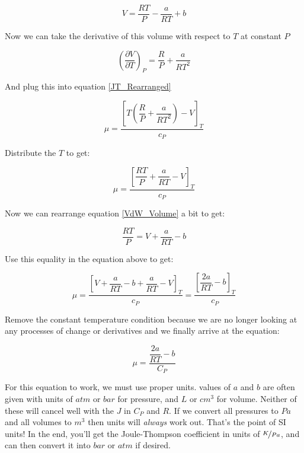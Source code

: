 \documentclass[12pt,letterpaper]{article}
\begin{document}
	\begin{equation}\label{VdW_Volume}
		V = \dfrac{RT}{P} - \dfrac{a}{RT} + b
	\end{equation}
	
	Now we can take the derivative of this volume with respect to $T$ at constant $P$
	
	\begin{equation}
		\left(\frac{\partial V}{\partial T}\right)_P = \dfrac{R}{P} + \dfrac{a}{RT^2}
	\end{equation}
	
	And plug this into equation \ref{JT_Rearranged}
	
	\begin{equation}\label{JT_Rearranged}
		\mu = \dfrac{\left[T \left(\dfrac{R}{P} + \dfrac{a}{RT^2}\right)-V\right]_T}{c_P}
	\end{equation}

	Distribute the $T$ to get:
	
	\begin{equation}
		\mu = \dfrac{\left[\dfrac{RT}{P} + \dfrac{a}{RT}-V\right]_T}{c_P}
	\end{equation}

	Now we can rearrange equation \ref{VdW_Volume} a bit to get:
	
	\begin{equation}
		\dfrac{RT}{P} = V + \dfrac{a}{RT} - b
	\end{equation}
	
	Use this equality in the equation above to get:
	
	\begin{equation}
		\mu = \dfrac{\left[ V + \dfrac{a}{RT} - b + \dfrac{a}{RT}-V\right]_T}{c_P} = \dfrac{\left[ \dfrac{2a}{RT} - b\right]_T}{c_P}
	\end{equation}

	Remove the constant temperature condition because we are no longer looking at any processes of change or derivatives and we finally arrive at the equation:
	
	\begin{equation}
		\mu=\dfrac{\dfrac{2a}{RT}-b}{C_P}
	\end{equation}

	For this equation to work, we must use proper units. values of $a$ and $b$ are often given with units of $atm$ or $bar$ for pressure, and $L$ or $cm^3$ for volume. Neither of these will cancel well with the $J$ in $C_P$ and $R$. If we convert all pressures to $Pa$ and all volumes to $m^3$ then units will \emph{always} work out. That's the point of SI units! In the end, you'll get the Joule-Thompson coefficient in units of $\nicefrac{K}{Pa}$, and can then convert it into $bar$ or $atm$ if desired.
	
\end{document}
